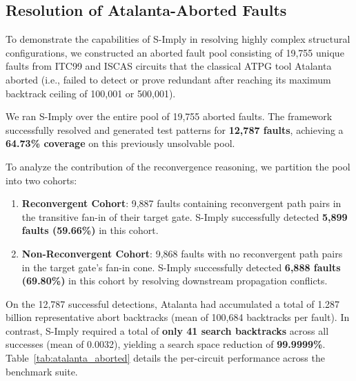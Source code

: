 \documentclass[conference]{IEEEtran}
\begin{document}
\subsection{Resolution of Atalanta-Aborted Faults}
To demonstrate the capabilities of S-Imply in resolving highly complex structural configurations, we constructed an aborted fault pool consisting of 19,755 unique faults from ITC99 and ISCAS circuits that the classical ATPG tool Atalanta aborted (i.e., failed to detect or prove redundant after reaching its maximum backtrack ceiling of 100,001 or 500,001).

We ran S-Imply over the entire pool of 19,755 aborted faults. The framework successfully resolved and generated test patterns for \textbf{12,787 faults}, achieving a \textbf{64.73\% coverage} on this previously unsolvable pool. 

To analyze the contribution of the reconvergence reasoning, we partition the pool into two cohorts:
\begin{enumerate}
    \item \textbf{Reconvergent Cohort}: 9,887 faults containing reconvergent path pairs in the transitive fan-in of their target gate. S-Imply successfully detected \textbf{5,899 faults (59.66\%)} in this cohort.
    \item \textbf{Non-Reconvergent Cohort}: 9,868 faults with no reconvergent path pairs in the target gate's fan-in cone. S-Imply successfully detected \textbf{6,888 faults (69.80\%)} in this cohort by resolving downstream propagation conflicts.
\end{enumerate}

On the 12,787 successful detections, Atalanta had accumulated a total of 1.287 billion representative abort backtracks (mean of 100,684 backtracks per fault). In contrast, S-Imply required a total of \textbf{only 41 search backtracks} across all successes (mean of 0.0032), yielding a search space reduction of \textbf{99.9999\%}. Table~\ref{tab:atalanta_aborted} details the per-circuit performance across the benchmark suite.
\end{document}
